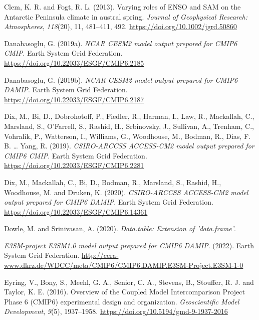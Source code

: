 \documentclass[12pt,oneside,a4paper]{reedthesis}
\newlength{\cslhangindent}
\newenvironment{CSLReferences}[2] %
 {%
  \setlength{\parindent}{0pt}
  \ifodd #1 \everypar{\setlength{\hangindent}{\cslhangindent}}\ignorespaces\fi
  \ifnum #2 > 0
  \setlength{\parskip}{#2\baselineskip}
  \fi
 }%
 {}
\begin{document}
\begin{CSLReferences}{1}{0}
\leavevmode{}%
Clem, K. R. and Fogt, R. L. (2013). Varying roles of {ENSO} and {SAM} on the {Antarctic Peninsula} climate in austral spring. \emph{Journal of Geophysical Research: Atmospheres}, \emph{118}(20), 11, 481--411, 492. \url{https://doi.org/10.1002/jgrd.50860}

\leavevmode{}%
Danabasoglu, G. (2019a). \emph{NCAR CESM2 model output prepared for CMIP6 CMIP}. Earth System Grid Federation. \url{https://doi.org/10.22033/ESGF/CMIP6.2185}

\leavevmode{}%
Danabasoglu, G. (2019b). \emph{NCAR CESM2 model output prepared for CMIP6 DAMIP}. Earth System Grid Federation. \url{https://doi.org/10.22033/ESGF/CMIP6.2187}

\leavevmode{}%
Dix, M., Bi, D., Dobrohotoff, P., Fiedler, R., Harman, I., Law, R., Mackallah, C., Marsland, S., O'Farrell, S., Rashid, H., Srbinovsky, J., Sullivan, A., Trenham, C., Vohralik, P., Watterson, I., Williams, G., Woodhouse, M., Bodman, R., Dias, F. B. \ldots{} Yang, R. (2019). \emph{CSIRO-ARCCSS ACCESS-CM2 model output prepared for CMIP6 CMIP}. Earth System Grid Federation. \url{https://doi.org/10.22033/ESGF/CMIP6.2281}

\leavevmode{}%
Dix, M., Mackallah, C., Bi, D., Bodman, R., Marsland, S., Rashid, H., Woodhouse, M. and Druken, K. (2020). \emph{CSIRO-ARCCSS ACCESS-CM2 model output prepared for CMIP6 DAMIP}. Earth System Grid Federation. \url{https://doi.org/10.22033/ESGF/CMIP6.14361}

\leavevmode{}%
Dowle, M. and Srinivasan, A. (2020). \emph{Data.table: {Extension} of 'data.frame'}.

\leavevmode{}%
\emph{E3SM-project E3SM1.0 model output prepared for CMIP6 DAMIP}. (2022). Earth System Grid Federation. \url{http://cera-www.dkrz.de/WDCC/meta/CMIP6/CMIP6.DAMIP.E3SM-Project.E3SM-1-0}

\leavevmode{}%
Eyring, V., Bony, S., Meehl, G. A., Senior, C. A., Stevens, B., Stouffer, R. J. and Taylor, K. E. (2016). Overview of the {Coupled Model Intercomparison Project Phase} 6 ({CMIP6}) experimental design and organization. \emph{Geoscientific Model Development}, \emph{9}(5), 1937--1958. \url{https://doi.org/10.5194/gmd-9-1937-2016}


\end{CSLReferences}
\end{document}
